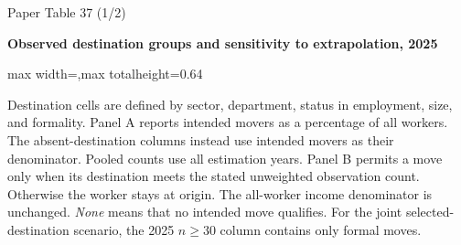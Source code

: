 \begin{frame}{Paper Table 37 (1/2)}
\begin{minipage}{\textwidth}\small\textbf{Observed destination groups and sensitivity to extrapolation, 2025}\end{minipage}\par\vspace{0.15cm}
\centering\begingroup\fontsize{8.5}{10}\selectfont
\setlength{\tabcolsep}{4pt}\renewcommand{\arraystretch}{1.06}
\begin{adjustbox}{max width=\textwidth,max totalheight=0.64\textheight}

\end{adjustbox}\endgroup\par\vspace{0.10cm}
{\fontsize{6.5}{7.5}\selectfont\raggedright Destination cells are defined by sector, department, status in employment, size, and formality. Panel A reports intended movers as a percentage of all workers. The absent-destination columns instead use intended movers as their denominator. Pooled counts use all estimation years. Panel B permits a move only when its destination meets the stated unweighted observation count. Otherwise the worker stays at origin. The all-worker income denominator is unchanged. \textit{None} means that no intended move qualifies. For the joint selected-destination scenario, the 2025 $n\geq30$ column contains only formal moves.\par}
\end{frame}


